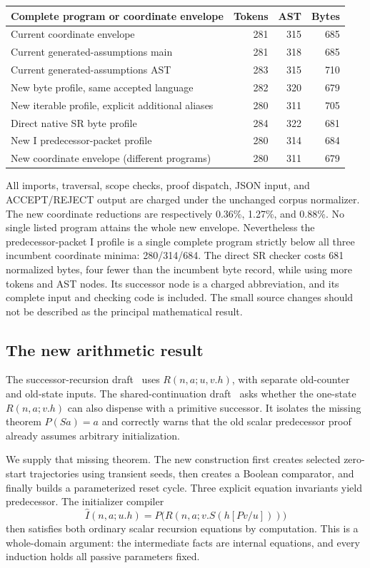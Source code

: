 \begin{center}
\begin{tabular}{p{.48\linewidth}rrr}
\toprule
Complete program or coordinate envelope & Tokens & AST & Bytes\\
\midrule
Current coordinate envelope &281&315&685\\
Current generated-assumptions main &281&318&685\\
Current generated-assumptions AST &283&315&710\\
New byte profile, same accepted language &282&320&679\\
New iterable profile, explicit additional aliases &280&311&705\\
Direct native SR byte profile &284&322&681\\
New I predecessor-packet profile &280&314&684\\
New coordinate envelope (different programs)&280&311&679\\
\bottomrule
\end{tabular}
\end{center}
All imports, traversal, scope checks, proof dispatch, JSON input, and
ACCEPT/REJECT output are charged under the unchanged corpus normalizer.
The new coordinate reductions are respectively 0.36\%, 1.27\%, and 0.88\%.
No single listed program attains the whole new envelope. Nevertheless
the predecessor-packet I profile is a single complete program strictly
below all three incumbent coordinate minima: 280/314/684. The direct SR
checker costs 681 normalized bytes, four fewer than the incumbent byte
record, while using more tokens and AST nodes. Its successor node is
a charged abbreviation, and its complete input and checking code is
included. The small source changes should not be described as the
principal mathematical result.

\subsection{The new arithmetic result}

The successor-recursion draft~\cite{successor} uses
$R(n,a;u,v.h)$, with separate old-counter and old-state inputs. The
shared-continuation draft~\cite{shared} asks whether the one-state
$R(n,a;v.h)$ can also dispense with a primitive successor. It isolates
the missing theorem $P(Sa)=a$ and correctly warns that the old scalar
predecessor proof already assumes arbitrary initialization.

We supply that missing theorem. The new construction first creates
selected zero-start trajectories using transient seeds, then creates a
Boolean comparator, and finally builds a parameterized reset cycle.
Three explicit equation invariants yield predecessor. The initializer
compiler
\[
 \widehat I(n,a;u.h)=P\bigl(R(n,a;v.S(h[Pv/u]))\bigr)
\]
then satisfies both ordinary scalar recursion equations by computation.
This is a whole-domain argument: the intermediate facts are internal
equations, and every induction holds all passive parameters fixed.

